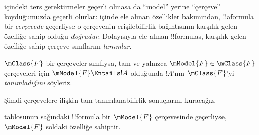 \documentclass[../../../include/open-logic-section]{subfiles}
\begin{document}


 içindeki ters gerektirmeler geçerli olmasa da
``model'' yerine ``çerçeve'' koyduğumuzda geçerli olurlar:
 içinde ele alınan özellikler bakımından,
!!a{formula} bir \emph{çerçevede} geçerliyse o çerçevenin erişilebilirlik
bağıntısının karşılık gelen özelliğe sahip olduğu \emph{doğrudur}. Dolayısıyla ele
alınan !!{formula}s, karşılık gelen özelliğe sahip çerçeve sınıflarını
\emph{tanımlar}.

\begin{defn}
  $\mClass{F}$ bir çerçeveler sınıfıysa, tam ve yalnızca
  $\mModel{F}\in\mClass{F}$ çerçeveleri için $\mModel{F}\Entails !A$
  olduğunda $!A$'nın $\mClass{F}$'yi \emph{tanımladığını} söyleriz.
\end{defn}

Şimdi çerçevelere ilişkin tam tanımlanabilirlik sonuçlarını kuracağız.

\begin{thm}
 tablosunun sağındaki !!{formula} bir
$\mModel{F}$ çerçevesinde geçerliyse, $\mModel{F}$ soldaki özelliğe
sahiptir.
\end{thm}
\end{document}
